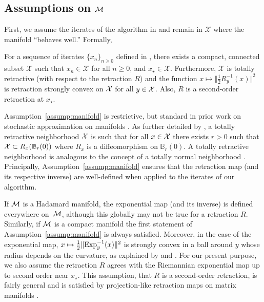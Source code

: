 \subsection{Assumptions on $\mathcal{M}$}
\vspace{-.0856cm}
First, we assume the iterates of the algorithm in  and 
remain in $\mathcal X$ where the manifold ``behaves well.'' Formally,
\vspace*{-4pt}
\begin{assumption} \label{assump:manifold}
  For a sequence of iterates $\{ x_n \}_{n \geq 0}$ defined in , there exists a compact, connected subset $\mathcal X$ such that $x_n \in \mathcal X$ for all $n \geq 0$, and $x_\star \in \mathcal X$. Furthermore, $\mathcal X$ is totally retractive (with respect  to the retraction $R$) and the function $x\mapsto \Vert \frac{1}{2} R_y^{-1}(x)\Vert^2$ is retraction strongly convex on $\mathcal{X}$ for all $y\in\mathcal{X}$. Also, $R$ is a second-order retraction at $x_\star$.
\end{assumption}
\vspace*{-4pt}
Assumption~\ref{assump:manifold} is restrictive, but standard in prior work on stochastic approximation on manifolds \cite[e.g.,][]{bonnabel2013stochastic, zhang2016riemannian, sato2017riemannian}.
As further detailed by \citet{huang2015broyden}, a totally retractive neighborhood $\mathcal{X}$ is such that
for all $x \in \mathcal{X}$ there exists $r>0$ such that $\mathcal{X} \subset R_{x} (\mathbb{B}_{r}(0))$
where $R_x$ is a diffeomorphism on $\mathbb{B}_{r}(0)$. A totally retractive neighborhood is analogous to the concept of a totally normal neighborhood \citep[see, e.g.,][Chap. 3, Sec. 3]{do2016differential}.
Principally, Assumption~\ref{assump:manifold} ensures that the retraction map (and its respective inverse) are well-defined when applied to the iterates of our
algorithm.

If $\mathcal{M}$ is a Hadamard manifold, the exponential map (and its inverse) is defined everywhere on~$\mathcal{M}$, although this globally may not
be true for a retraction $R$. Similarly, if $\mathcal{M}$ is a compact manifold the first statement of Assumption~\ref{assump:manifold} is always satisfied. Moreover, in the case of the exponential map, $x \mapsto \frac{1}{2} \Vert \Exp_y^{-1}(x)\Vert^2$ is strongly convex in a ball around $y$
whose radius depends on the curvature, as explained by \citet{Afs11} and \citet[Ch. IV, Sec. 2 Lemma 2.9]{Sak96}. For our present purpose, we also assume the retraction $R$ agrees with the Riemannian exponential map up to second order near $x_\star$. This assumption, that $R$ is a second-order retraction, is fairly general and is satisfied by projection-like retraction maps on matrix manifolds \citep[see][]{AbsMal12}.
\vspace*{-.8cm}
